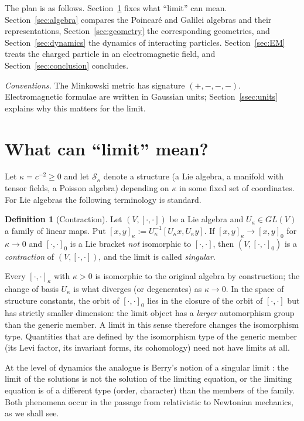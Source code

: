 \documentclass[11pt,a4paper]{article}
\theoremstyle{plain}
\theoremstyle{definition}
\newtheorem{definition}{Definition}
\theoremstyle{remark}
\begin{document}
The plan is as follows. Section~\ref{sec:limits} fixes what ``limit'' can mean.
Section~\ref{sec:algebra} compares the Poincar\'e and Galilei algebras and their representations,
Section~\ref{sec:geometry} the corresponding geometries, and Section~\ref{sec:dynamics} the
dynamics of interacting particles. Section~\ref{sec:EM} treats the charged particle in an
electromagnetic field, and Section~\ref{sec:conclusion} concludes.

\emph{Conventions.} The Minkowski metric has signature $(+,-,-,-)$. Electromagnetic formulae are
written in Gaussian units; Section~\ref{ssec:units} explains why this matters for the limit.

\section{What can ``limit'' mean?}\label{sec:limits}
Let $\kappa=c^{-2}\ge 0$ and let $\mathcal S_\kappa$ denote a structure (a Lie algebra, a
manifold with tensor fields, a Poisson algebra) depending on $\kappa$ in some fixed set of
coordinates. For Lie algebras the following terminology is standard.

\begin{definition}[Contraction]
Let $(V,[\cdot,\cdot])$ be a Lie algebra and $U_\kappa\in GL(V)$ a family of linear maps. Put
$[x,y]_\kappa:=U_\kappa^{-1}[U_\kappa x,U_\kappa y]$. If $[x,y]_\kappa\to[x,y]_0$ for $\kappa\to 0$
and $[\cdot,\cdot]_0$ is a Lie bracket \emph{not} isomorphic to $[\cdot,\cdot]$, then
$(V,[\cdot,\cdot]_0)$ is a \emph{contraction} of $(V,[\cdot,\cdot])$, and the limit is called \emph{singular}.
\end{definition}

Every $[\cdot,\cdot]_\kappa$ with $\kappa>0$ is isomorphic to the original algebra by construction;
the change of basis $U_\kappa$ is what diverges (or degenerates) as $\kappa\to 0$. In the space of
structure constants, the orbit of $[\cdot,\cdot]_0$ lies in the closure of the orbit of
$[\cdot,\cdot]$ but has strictly smaller dimension: the limit object has a \emph{larger}
automorphism group than the generic member. A limit in this sense therefore changes the
isomorphism type. Quantities that are defined by the isomorphism type of the generic member (its
Levi factor, its invariant forms, its cohomology) need not have limits at all.

At the level of dynamics the analogue is Berry's notion of a singular limit
\cite{Berry94,Batterman02}: the limit of the solutions is not the solution of the limiting
equation, or the limiting equation is of a different type (order, character) than the members of
the family. Both phenomena occur in the passage from relativistic to Newtonian mechanics, as we
shall see.
\end{document}
